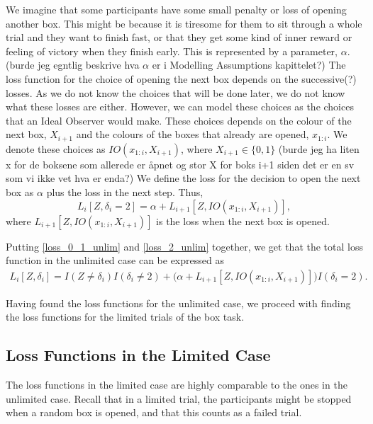 We imagine that some participants have some small penalty or loss of opening another box. This might be because it is tiresome for them to sit through a whole trial and they want to finish fast, or that they get some kind of inner reward or feeling of victory when they finish early. This is represented by a parameter, $\alpha$. (burde jeg egntlig beskrive hva $\alpha$ er i Modelling Assumptions kapittelet?)
The loss function for the choice of opening the next box depends on the successive(?) losses. As we do not know the choices that will be done later, we do not know what these losses are either. However, we can model these choices as the choices that an Ideal Observer would make. These choices depends on the colour of the next box, $X_{i+1}$ and the colours of the boxes that already are opened, $x_{1:i}$. We denote these choices as $IO(x_{1:i},X_{i+1})$, where $X_{i+1} \in \{0,1\}$ (burde jeg ha liten x for de boksene som allerede er åpnet og stor X for boks i+1 siden det er en sv som vi ikke vet hva er enda?)
We define the loss for the decision to open the next box as $\alpha$ plus the loss in the next step. Thus, 
\begin{equation}
\label{loss_2_unlim}
    L_i[Z,\delta_i=2] = \alpha + L_{i+1}[Z,IO(x_{1:i},X_{i+1})],
\end{equation}
where $L_{i+1}[Z,IO(x_{1:i},X_{i+1})]$ is the loss when the next box is opened. 


Putting \eqref{loss_0_1_unlim} and \eqref{loss_2_unlim} together, we get that the total loss function in the unlimited case can be expressed as
\begin{equation*}
    \begin{aligned}
       L_i[Z,\delta_{i}] 
       = I(Z \neq \delta_i)I(\delta_i\neq2)
       + \big(\alpha + L_{i+1}[Z,IO(x_{1:i},X_{i+1})] \big) I(\delta_i=2).
    \end{aligned}
\end{equation*}

Having found the loss functions for the unlimited case, we proceed with finding the loss functions for the limited trials of the box task. 


\subsection{Loss Functions in the Limited Case}
The loss functions in the limited case are highly comparable to the ones in the unlimited case. Recall that in a limited trial, the participants might be stopped when a random box is opened, and that this counts as a failed trial. 

